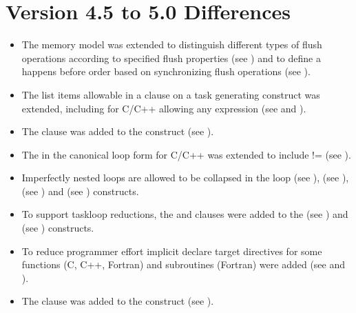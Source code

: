 \section{Version 4.5 to 5.0 Differences}
\label{sec:Version 4.5 to 5.0 Differences}

\begin{itemize}
\item The memory model was extended to distinguish different types of flush
    operations according to specified flush properties (see
    ) and to define a happens before order
    based on synchronizing flush operations (see ).

\item The list items allowable in a  clause on a task generating
      construct was extended, including for C/C++ allowing any  expression (see
       and ).

\item The  clause was added to the  construct (see ).

\item The  in the canonical loop form for C/C++ was
extended to include != (see ).

\item Imperfectly nested loops are allowed to be collapsed in the
loop (see ), 
(see ),  (see
) and  (see
) constructs.

\item To support taskloop reductions, the  and
 clauses were added to the  (see
) and  (see
) constructs.

\item To reduce programmer effort implicit declare target directives for
some functions (C, C++, Fortran) and subroutines (Fortran) were added (see
 and ).

\item The  clause was added to the  construct (see
).


\end{itemize}
